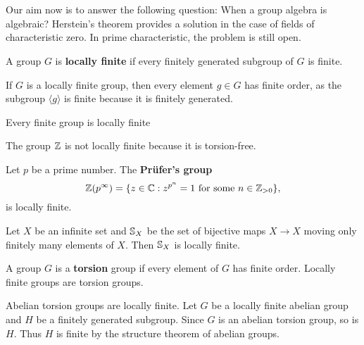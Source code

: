 \chapter{}


Our aim now is to answer the following question: When
a group algebra is algebraic? Herstein's theorem provides
a solution in the case of fields of characteristic zero. In prime characteristic,
the problem is still open. 

\begin{definition}
	A group $G$ is \textbf{locally finite} if every finitely generated 
	subgroup of $G$ is finite. 
\end{definition}

If $G$ is a locally finite group, then every element $g\in G$ has finite order, as
the subgroup $\langle g\rangle$ is finite because it is finitely generated.

\begin{example}
    Every finite group is locally finite
\end{example}

\begin{example}
    The group $\mathbb{Z}$ is not locally finite because it is torsion-free.
\end{example}

\begin{example}
	Let $p$ be a prime number. 
	The \textbf{Pr\"ufer's group}  
	\[
		\mathbb{Z}(p^{\infty})=\{z\in\mathbb{C}:z^{p^n}=1\text{ for some $n\in\mathbb{Z}_{>0}$}\}, 
	\]
	is locally finite. 
\end{example}

\begin{example}
	Let $X$ be an infinite set and $\mathbb{S}_X$ be the set of bijective maps $X\to
	X$ moving only finitely many elements of $X$. Then 
	$\mathbb{S}_X$ is locally finite.
\end{example}

A group $G$ is a \textbf{torsion} group if every element of $G$
has finite order. Locally finite groups are torsion groups. 

\begin{example}
    Abelian torsion groups are locally finite. Let $G$ be a locally finite abelian group 
    and $H$ be a finitely generated subgroup. Since $G$ is an abelian torsion group, so is $H$. Thus
    $H$ is finite by the structure theorem of abelian groups. 
\end{example}

